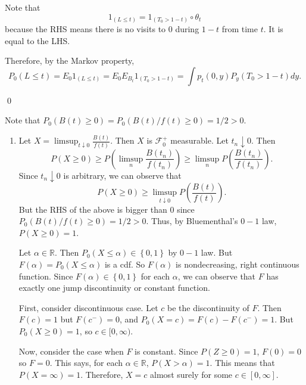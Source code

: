 \begin{problem}[7.2.2] \hfill

	Note that 
	\[
		1_{(L \le t)} = 1_{(T_0 > 1-t)} \circ \theta_t
	\]
	because the RHS means there is no visits to $0$ during $1-t$ from time $t$.
	It is equal to the LHS.

	Therefore, by the Markov property,
	\[
		P_0\left( L \le t \right)
		= E_0 1_{(L\le t)}
		= E_0 E_{B_t}1_{(T_0 > 1-t)}
		= \int p_t(0, y)P_y(T_0 > 1-t) dy.
	\]

	\qed
\end{problem}

\begin{problem}[7.2.4] \hfill

	Note that $P_0 (B(t) \ge 0) = P_0\left( B(t) / f(t) \ge 0 \right) = 1/2 >0$.

	\begin{enumerate}
		\item	Let $X = \limsup_{ t \downarrow 0} \frac{B(t)}{f(t)}$.
	Then $X$ is $\mathcal{F}_0^+$ measurable.
	Let $t_n \downarrow 0$.
	Then
	\[
		P(X \ge 0) \ge 
		P\left(\limsup_{n} \frac{B(t_n)}{f(t_n)} \right )
		\ge \limsup_n P\left( \frac{B(t_n)}{f(t_n)} \right).
	\]
	Since $t_n \downarrow 0$ is arbitrary, we can observe that
	\[
		P\left( X \ge 0 \right) \ge \limsup_{t\downarrow 0} P\left( \frac{B(t)}{f(t)} \right).
	\]
	But the RHS of the above is bigger than $0$ since $P_0\left( B(t)/f(t) \ge 0 \right) = 1/2 > 0$.
	Thus, by Bluementhal's $0-1$ law, $P(X \ge 0) = 1$.

	Let $\alpha \in \mathbb{R}$.
	Then $P_0(X \le \alpha) \in \left\{ 0, 1 \right\}$ by $0-1$ law.
	But $F(\alpha) = P_0(X \le \alpha)$ is a cdf.
	So $F(\alpha)$ is nondecreasing, right continuous function.
	Since $F(\alpha) \in \left\{ 0, 1 \right\}$ for each $\alpha$, we can observe that
	$F$ has exactly one jump discontinuity or constant function.
	
	First, consider discontinuous case. 
	Let $c$ be the discontinuity of $F$.
	Then $F(c) = 1$ but $F(c^-) = 0$, and $P_0(X = c) = F(c) - F(c^-) = 1$.
	But $P_0(X \ge 0) = 1$, so $c \in [0, \infty)$.

	Now, consider the case when $F$ is constant.
	Since $P(Z \ge 0) = 1$, $F(0) = 0$ so $F = 0$.
	This says, for each $\alpha \in \mathbb{R}$, $P(X > \alpha) = 1$.
	This means that $P(X  = \infty) = 1$.
	Therefore, $X = c$ almost surely for some $c \in [0, \infty]$.


\end{enumerate}
\end{problem}
